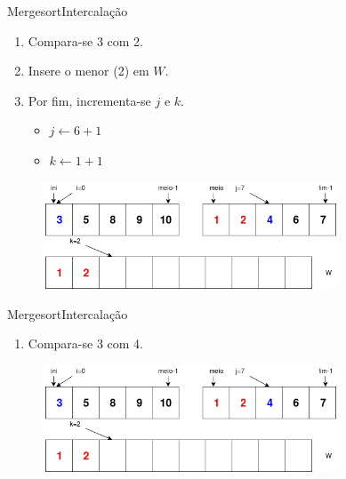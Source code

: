 \documentclass[aspectratio=169]{beamer}
\begin{document}
\begin{frame}{Mergesort}{Intercalação}
\begin{enumerate}
 \item Compara-se 3 com 2.
 \item Insere o menor (2) em $W$.
 \item Por fim, incrementa-se $j$ e $k$.
 \begin{itemize}
 \item $j\leftarrow 6 +1$
 \item $k\leftarrow 1 + 1$
 \end{itemize}  
\end{enumerate}

\begin{figure}[!h]
  \centering
  \includegraphics[width=250pt]{imgs/merge/merge3.png}
  \label{fig_merge2_2}
\end{figure}
\end{frame}


\begin{frame}{Mergesort}{Intercalação}
\begin{enumerate}
 \item Compara-se 3 com 4. 
\end{enumerate}

\begin{figure}[!h]
  \centering
  \includegraphics[width=250pt]{imgs/merge/merge3.png}
  \label{fig_merge3}
\end{figure}
\end{frame}

\end{document}
